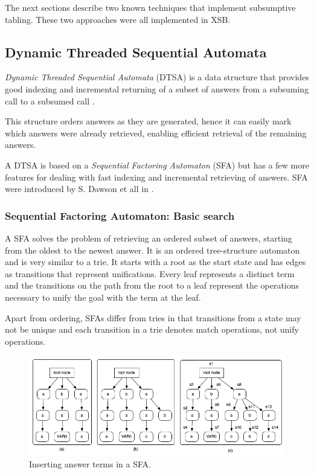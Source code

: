 The next sections describe two known techniques that implement subsumptive tabling. These two approaches were all implemented in XSB.

  \subsection{Dynamic Threaded Sequential Automata}\label{sec:dtsa}

  \textit{Dynamic Threaded Sequential Automata} (DTSA) is a data structure that provides good indexing and incremental
  returning of a subset of answers from a subsuming call to a subsumed call \cite{Rao-96}.
  
  This structure orders answers as they are generated, hence it can easily mark which answers were already retrieved, enabling
  efficient retrieval of the remaining answers.
  
  A DTSA is based on a \textit{Sequential Factoring Automaton} (SFA) but has a few more features for dealing with fast indexing
  and incremental retrieving of answers. SFA were introduced by S. Dawson et all in \cite{Dawnson-95}. 
  
  \subsubsection{Sequential Factoring Automaton: Basic search}
  
  A SFA solves the problem of retrieving an ordered subset of answers, starting from the oldest to the newest answer. It is an ordered
  tree-structure automaton and is very similar to a trie. It starts with a root as the start state and has edges as transitions
  that represent unifications. Every leaf represents a distinct term and the transitions on the path from the root to a leaf
  represent the operations necessary to unify the goal with the term at the leaf.
  
  Apart from ordering, SFAs differ from tries in that transitions from a state may not be unique and each transition in a trie
  denotes match operations, not unify operations.
  
  \begin{figure}[ht]
    \centering
      \includegraphics[scale=0.6]{sfa.png}
    \caption{Inserting answer terms in a SFA.}
    \label{fig:sfa_example}
  \end{figure}
  
